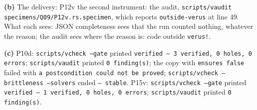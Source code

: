 \documentclass[11pt]{article}
\begin{document}
\begin{answer}
\textbf{(b)} The delivery: P12v \quad the second instrument: the audit,
\texttt{scripts/vaudit specimens/Q09/P12v.rs.specimen}, which reports
\texttt{outside-verus} at line 49. \\
What each sees: JSON completeness sees that the run counted nothing, whatever
the reason; the audit sees where the reason is: code outside \texttt{verus!}.

\textbf{(c)} P10d: \texttt{scripts/vcheck --gate} printed \texttt{verified ---
3 verified, 0 holes, 0 errors}; \texttt{scripts/vaudit} printed \texttt{0
finding(s)}; the copy with \texttt{ensures false} failed with \texttt{a
postcondition could not be proved}; \texttt{scripts/vcheck --brittleness
--solvers} ended \texttt{--- stable}. P15v: \texttt{scripts/vcheck --gate} printed
\texttt{verified --- 1 verified, 0 holes, 0 errors}; \texttt{scripts/vaudit}
printed \texttt{0 finding(s)}.
\end{answer}

\end{document}
